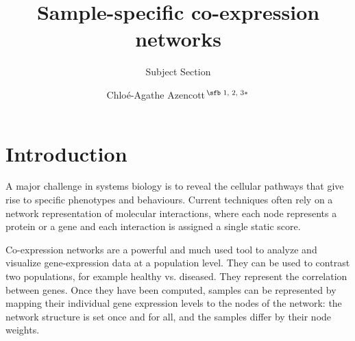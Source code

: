 \documentclass{bioinfo}
\newcommand{\todo}[1]{{\color{teal} #1}}
\begin{document}

\subtitle{Subject Section}

\title[Sample-specific co-expression networks]{Sample-specific co-expression networks}
\author[Azencott]{Chlo\'e-Agathe Azencott\,$^{\text{\sfb 1, 2, 3}*}$}
\address{$^{\text{\sf 1}}$MINES ParisTech, PSL-Research University, CBIO-Centre for Computational Biology, 35 rue St Honor\'e 77300 Fontainebleau, France\\
$^{\text{\sf 2}}$Institut Curie, 75248 Paris Cedex 05, France\\
$^{\text{\sf 3}}$INSERM, U900, 75248 Paris Cedex 05, France}





\maketitle

\section{Introduction}

\todo{A major challenge in systems biology is to reveal the cellular pathways that give rise to specific phenotypes and behaviours. Current techniques often rely on a network representation of molecular interactions, where each node represents a protein or a gene and each interaction is assigned a single static score.}

Co-expression networks are a powerful and much used tool to analyze and visualize gene-expression data at a population level. 
They can be used to contrast two populations, for example healthy vs. diseased. 
They represent the correlation between genes.
Once they have been computed, samples can be represented by mapping their individual gene expression levels to the nodes of the network: the network structure is set once and for all, and the samples differ by their node weights.
\end{document}
